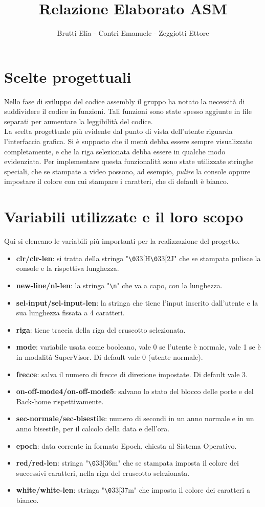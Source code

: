 \documentclass{article}
\title{Relazione Elaborato ASM}
\author{Brutti Elia - Contri Emanuele - Zeggiotti Ettore}
\newcommand*{\escape}[1]{\texttt{\textbackslash#1}}
\begin{document}
\maketitle

\section{Scelte progettuali}
Nello fase di sviluppo del codice assembly il gruppo ha notato la necessità di suddividere il codice in funzioni. Tali funzioni sono state spesso aggiunte in file separati per aumentare la leggibilità del codice.
\\
La scelta progettuale più evidente dal punto di vista dell'utente riguarda l'interfaccia grafica. Si è supposto che il menù debba essere sempre visualizzato completamente, e che la riga selezionata debba essere in qualche modo evidenziata. Per implementare questa funzionalità sono state utilizzate stringhe speciali, che se stampate a video possono, ad esempio, \emph{pulire} la console oppure impostare il colore con cui stampare i caratteri, che di default è bianco.

\section{Variabili utilizzate e il loro scopo}
Qui si elencano le variabili più importanti per la realizzazione del progetto.
\begin{itemize}
    \item \textbf{clr/clr-len}: si tratta della stringa "\escape{0}33[H\escape{0}33[2J" che se stampata pulisce la console e la rispettiva lunghezza.
    \item \textbf{new-line/nl-len}: la stringa "\escape{n}" che va a capo, con la lunghezza.
    \item \textbf{sel-input/sel-input-len}: la stringa che tiene l'input inserito dall'utente e la sua lunghezza fissata a 4 caratteri.
    \item \textbf{riga}: tiene traccia della riga del cruscotto selezionata.
    \item \textbf{mode}: variabile usata come booleano, vale 0 se l'utente è normale, vale 1 se è in modalità SuperVisor. Di default vale 0 (utente normale).
    \item \textbf{frecce}: salva il numero di frecce di direzione impostate. Di default vale 3.
    \item \textbf{on-off-mode4/on-off-mode5}: salvano lo stato del blocco delle porte e del Back-home rispettivamente.
    \item \textbf{sec-normale/sec-bisestile}: numero di secondi in un anno normale e in un anno bisestile, per il calcolo della data e dell'ora.
    \item \textbf{epoch}: data corrente in formato Epoch, chiesta al Sistema Operativo.
    \item \textbf{red/red-len}: stringa "\escape{0}33[36m" che se stampata imposta il colore dei successivi caratteri, nella riga del cruscotto selezionata.
    \item \textbf{white/white-len}: stringa "\escape{0}33[37m" che imposta il colore dei caratteri a bianco.
    
\end{itemize}
\end{document}
